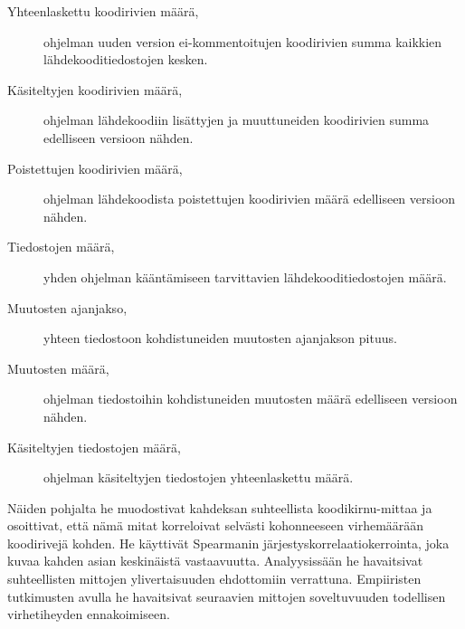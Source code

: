 \documentclass[finnish]{../tktltiki2}
\theoremstyle{definition}
\theoremstyle{remark}
\begin{document}
\begin{description}
    
    \item[Yhteenlaskettu koodirivien määrä,] ohjelman uuden version ei-kommen\-toitujen koodirivien summa kaikkien 
    lähdekooditiedostojen kesken.
    
    \item[Käsiteltyjen koodirivien määrä,] ohjelman lähdekoodiin lisättyjen ja muuttuneiden koodirivien summa 
    edelliseen versioon nähden.
    
    \item[Poistettujen koodirivien määrä,] ohjelman lähdekoodista poistettujen koodirivien määrä edelliseen versioon 
    nähden.
    
    \item[Tiedostojen määrä,] yhden ohjelman kääntämiseen tarvittavien lähdekoodi\-tiedostojen määrä.
    
    \item[Muutosten ajanjakso,] yhteen tiedostoon kohdistuneiden muutosten ajanjakson pituus.
    
    \item[Muutosten määrä,] ohjelman tiedostoihin kohdistuneiden muutosten määrä edelliseen versioon nähden.
    
    \item[Käsiteltyjen tiedostojen määrä,] ohjelman käsiteltyjen tiedostojen yhteenlaskettu määrä.

\end{description}

    Näiden pohjalta he muodostivat kahdeksan suhteellista koodikirnu-mittaa ja osoittivat, että nämä mitat korreloivat 
selvästi kohonneeseen virhemäärään koodirivejä kohden. He käyttivät Spearmanin järjestyskorrelaatiokerrointa, joka kuvaa 
kahden asian keskinäistä vastaavuutta. Analyysissään he havaitsivat suhteellisten mittojen ylivertaisuuden ehdottomiin 
verrattuna. Empiiristen tutkimusten avulla he havaitsivat seuraavien mittojen soveltuvuuden todellisen virhetiheyden 
ennakoimiseen.
\end{document}
